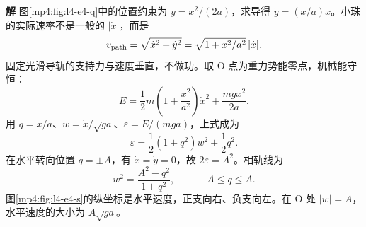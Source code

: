 \documentclass[11pt,openany,fontset=fandol]{ctexbook}
\theoremstyle{definition}\newtheorem{example}{例}[chapter]\newtheorem{exercise}{习题}[chapter]
\newcommand{\SolutionStart}{\par\medskip\ifdim\pagetotal>0pt\ifdim\dimexpr\pagegoal-\pagetotal\relax<3\baselineskip\newpage\fi\fi\noindent\textbf{解}\quad\ignorespaces}
\newenvironment{solution}{\SolutionStart}{\par\medskip}
\begin{document}
\begin{solution}
图\ref{mp4:fig:l4-e4-q}中的位置约束为 $y=x^2/(2a)$，求导得 $\dot y=(x/a)\dot x$。小珠的实际速率不是一般的 $|\dot x|$，而是
\[
v_{\rm path}=\sqrt{\dot x^2+\dot y^2}
=\sqrt{1+x^2/a^2}\,|\dot x|.
\]
固定光滑导轨的支持力与速度垂直，不做功。取 O 点为重力势能零点，机械能守恒：
\[
E=\frac12m\left(1+\frac{x^2}{a^2}\right)\dot x^2
+\frac{mgx^2}{2a}.
\]
用 $q=x/a$、$w=\dot x/\sqrt{ga}$、$\varepsilon=E/(mga)$，上式成为
\[
\varepsilon=\frac12(1+q^2)w^2+\frac12q^2.
\]
在水平转向位置 $q=\pm A$，有 $\dot x=\dot y=0$，故 $2\varepsilon=A^2$。相轨线为
\begin{equation}\label{mp4:eq:l4-parabola-phase}
w^2=\frac{A^2-q^2}{1+q^2},\qquad -A\le q\le A.
\end{equation}
图\ref{mp4:fig:l4-e4-s}的纵坐标是水平速度，正支向右、负支向左。在 O 处 $|w|=A$，水平速度的大小为 $A\sqrt{ga}$。


\end{solution}
\end{document}
